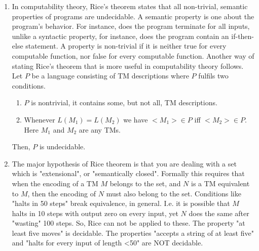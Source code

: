 \documentclass[a4paper,12pt]{article}
\begin{document}
\begin{enumerate}
\item In computability theory, Rice's theorem states that all non-trivial, semantic properties of programs are undecidable. A semantic property is one about the program's behavior. For instance, does the program terminate for all inputs, unlike a syntactic property, for instance, does the program contain an if-then-else statement. A property is non-trivial if it is neither true for every computable function, nor false for every computable function. Another way of stating Rice's theorem that is more useful in computability theory follows. \\
Let $P$ be a language consisting of TM descriptions where $P$ fulfils two conditions. \begin{enumerate}[label=\arabic*)]
\item $P$ is nontrivial, it contains some, but not all, TM descriptions.
\item Whenever $L(M_1) = L(M_2)$ we have $<M_1> \in P$ iff $<M_2> \in P$. Here $M_1$ and $M_2$ are any TMs.
\end{enumerate}
Then, $P$ is undecidable.
\item The major hypothesis of Rice theorem is that you are dealing with a set which is "extensional", or "semantically closed". Formally this requires that when the encoding of a TM $M$ belongs to the set, and $N$ is a TM equivalent to $M$, then the encoding of $N$ must also belong to the set. Conditions like "halts in 50 steps" break equivalence, in general. I.e. it is possible that $M$ halts in 10 steps with output zero on every input, yet $N$ does the same after "wasting" 100 steps. So, Rice can not be applied to these. The property "at least five moves" is decidable. The properties "accepts a string of at least five" and "halts for every input of length <50" are NOT decidable.
\end{enumerate}
\end{document}
